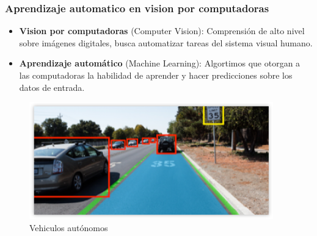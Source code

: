 \documentclass[12pt,center]{beamer}
\begin{document}
\begin{frame}
  \frametitle{Aprendizaje automatico en vision por computadoras}
  \begin{itemize}
    \item \textbf{Vision por computadoras} (Computer Vision): Comprensión de alto nivel sobre imágenes digitales, busca automatizar tareas del sistema visual humano.
    \item \textbf{Aprendizaje automático} (Machine Learning): Algortimos que otorgan a las computadoras la habilidad de aprender y hacer predicciones sobre los datos de entrada. 
  \end{itemize}

  
    \begin{figure}[H]
      \begin{center}
	\includegraphics[width=0.8\linewidth]{./img/nvidia_car_detection.png}
      \end{center}
      \caption{Vehiculos autónomos}
    \end{figure}    
\end{frame}
  
\end{document}
